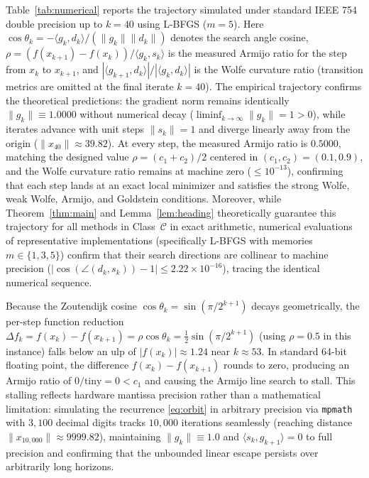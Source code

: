 \documentclass[11pt]{article}
\newcommand{\ip}[2]{\langle #1,#2\rangle}
\begin{document}
Table~\ref{tab:numerical} reports the trajectory simulated under standard IEEE 754 double precision up to $k = 40$ using L-BFGS ($m=5$).
Here $\cos\theta_k = -\ip{g_k}{d_k}/(\|g_k\|\|d_k\|)$ denotes the search angle cosine, $\rho = (f(x_{k+1}) - f(x_k))/\ip{g_k}{s_k}$ is the measured Armijo ratio for the step from $x_k$ to $x_{k+1}$, and $|\ip{g_{k+1}}{d_k}| / |\ip{g_k}{d_k}|$ is the Wolfe curvature ratio (transition metrics are omitted at the final iterate $k=40$).
The empirical trajectory confirms the theoretical predictions: the gradient norm remains identically $\|g_k\| \equiv 1.0000$ without numerical decay ($\liminf_{k\to\infty} \|g_k\| = 1 > 0$), while iterates advance with unit steps $\|s_k\| = 1$ and diverge linearly away from the origin ($\|x_{40}\| \approx 39.82$).
At every step, the measured Armijo ratio is $0.5000$, matching the designed value $\rho=(c_1+c_2)/2$ centered in $(c_1, c_2) = (0.1, 0.9)$, and the Wolfe curvature ratio remains at machine zero ($\le 10^{-13}$), confirming that each step lands at an exact local minimizer and satisfies the strong Wolfe, weak Wolfe, Armijo, and Goldstein conditions.
Moreover, while Theorem~\ref{thm:main} and Lemma~\ref{lem:heading} theoretically guarantee this trajectory for all methods in Class~$\mathcal{C}$ in exact arithmetic, numerical evaluations of representative implementations (specifically L-BFGS with memories $m \in \{1, 3, 5\}$) confirm that their search directions are collinear to machine precision ($|\cos(\angle(d_k, s_k)) - 1| \le 2.22 \times 10^{-16}$), tracing the identical numerical sequence.

Because the Zoutendijk cosine $\cos\theta_k = \sin(\pi/2^{k+1})$ decays geometrically, the per-step function reduction $\Delta f_k = f(x_k) - f(x_{k+1}) = \rho\cos\theta_k = \frac{1}{2}\sin(\pi/2^{k+1})$ (using $\rho = 0.5$ in this instance) falls below an ulp of $|f(x_k)| \approx 1.24$ near $k \approx 53$.
In standard 64-bit floating point, the difference $f(x_k) - f(x_{k+1})$ rounds to zero, producing an Armijo ratio of $0/\text{tiny} = 0 < c_1$ and causing the Armijo line search to stall.
This stalling reflects hardware mantissa precision rather than a mathematical limitation: simulating the recurrence \eqref{eq:orbit} in arbitrary precision via \texttt{mpmath} with $3{,}100$ decimal digits tracks $10{,}000$ iterations seamlessly (reaching distance $\|x_{10{,}000}\| \approx 9999.82$), maintaining $\|g_k\| \equiv 1.0$ and $\ip{s_k}{g_{k+1}} = 0$ to full precision and confirming that the unbounded linear escape persists over arbitrarily long horizons.
\end{document}

